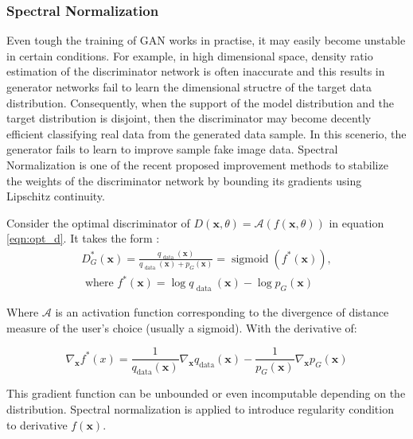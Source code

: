 \subsubsection{Spectral Normalization}
\label{sec:alad_sn}

Even tough the training of GAN works in practise, it may easily become unstable in certain
conditions. For example, in high dimensional space, density ratio estimation of the discriminator
network is often inaccurate and this results in generator networks fail to learn the dimensional
structre of the target data distribution. \cite{methods} Consequently, when the support of the model
distribution and the target distribution is disjoint, then the discriminator may become decently
efficient classifying real data from the generated data sample. In this scenerio, the generator
fails to learn to improve sample fake image data. Spectral Normalization is one of the recent
proposed improvement methods to stabilize the weights of the discriminator network by bounding its
gradients using Lipschitz continuity. \cite{inproceedings_sn} 

Consider the optimal discriminator of $D(\boldsymbol{x}, \theta)=\mathcal{A}(f(\boldsymbol{x}, \theta))$ in equation \ref{eqn:opt_d}. It takes the form :
\begin{multline}
    D_{G}^{*}(\boldsymbol{x})=\frac{q_{\text { data }}(\boldsymbol{x})}{q_{\text { data }}(\boldsymbol{x})+p_{G}(\boldsymbol{x})}=\operatorname{sigmoid}\left(f^{*}(\boldsymbol{x})\right), \\ \text { where } f^{*}(\boldsymbol{x})=\log q_{\text { data }}(\boldsymbol{x})-\log p_{G}(\boldsymbol{x}) 
\end{multline}

Where $\mathcal{A}$ is an activation function corresponding to the divergence of distance measure of the
user’s choice (usually a sigmoid). With the derivative of: 

\begin{equation}
    \nabla_{\boldsymbol{x}} f^{*}(x)=\frac{1}{q_{\mathrm{data}}(\boldsymbol{x})} \nabla_{\boldsymbol{x}} q_{\mathrm{data}}(\boldsymbol{x})-\frac{1}{p_{G}(\boldsymbol{x})} \nabla_{\boldsymbol{x}} p_{G}(\boldsymbol{x})  
\end{equation}

This gradient function can be unbounded or even incomputable depending on the distribution. Spectral
normalization is applied to introduce regularity condition to derivative $f(\boldsymbol{x})$.
\cite{inproceedings_sn} 


